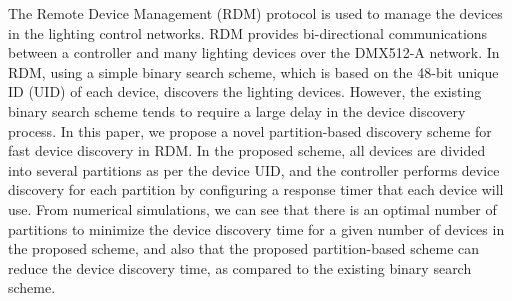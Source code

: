 \documentclass[10pt,twoside]{article}
\begin{document}


\begin{jipsabstract}
The Remote Device Management (RDM) protocol is used to manage the devices in
the lighting control networks. RDM provides bi-directional communications
between a controller and many lighting devices over the DMX512-A network. In
RDM, using a simple binary search scheme, which is based on the 48-bit unique
ID (UID) of each device, discovers the lighting devices. However, the existing
binary search scheme tends to require a large delay in the device discovery
process. In this paper, we propose a novel partition-based discovery scheme
for fast device discovery in RDM. In the proposed scheme, all devices are
divided into several partitions as per the device UID, and the controller
performs device discovery for each partition by configuring a response timer
that each device will use. From numerical simulations, we can see that there
is an optimal number of partitions to minimize the device discovery time for a
given number of devices in the proposed scheme, and also that the proposed
partition-based scheme can reduce the device discovery time, as compared to
the existing binary search scheme.
\end{jipsabstract}
\end{document}
